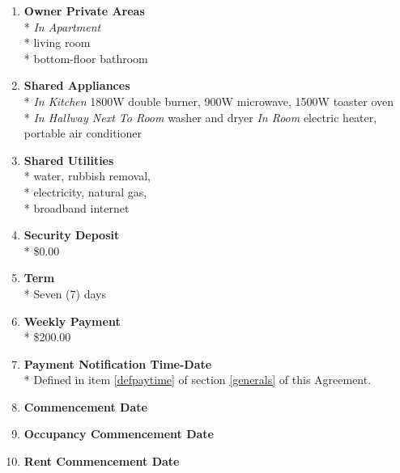 \documentclass[12pt,letterpaper]{article}
\newcommand{\apt}{Apartment}
\newcommand{\room}{Room}
\newcommand{\livingroom}{Owner Private Areas}
\newcommand{\appliances}{Shared Appliances}
\newcommand{\utilities}{Shared Utilities}
\newcommand{\deposit}{Security Deposit}
\newcommand{\rent}{Weekly Payment}
\newcommand{\signdate}{Commencement Date}
\newcommand{\firstday}{Occupancy Commencement Date}
\newcommand{\rentdate}{Rent Commencement Date}
\newcommand{\paymenttime}{Payment Notification Time-Date}
\begin{document}
\begin{multicols}{2}
\begin{enumerate}
		\item \textbf{\livingroom{}}\\* \label{livingroom}
			\textit{In \apt{}}\\*
			living room\\*
			bottom-floor bathroom
			
		\item \textbf{\appliances}\\* \label{appliances}
			\textit{In Kitchen} 1800W double burner,
			900W microwave,
			1500W toaster oven\\*
			\textit{In Hallway Next To \room{}} washer and dryer
			\textit{In \room{}} electric heater,
			portable air conditioner
			
		\item \textbf{\utilities{}}\\* \label{utilities}
			water,
			rubbish removal,\\*
			electricity,
			natural gas,\\*
			broadband internet

		\item \textbf{\deposit{}}\\* \label{deposit}
			\$0.00

		\item \textbf{Term}\\*
			Seven (7) days

		\item \textbf{\rent{}}\\* \label{rent}
			\$200.00

		\item \textbf{\paymenttime{}}\\* \label{paymenttime}
			Defined in item \ref{defpaytime} of section \ref{generals} of this Agreement.

		\item \textbf{\signdate{}} \label{signdate}

			\vspace{0.5cm}\makebox[2in]{\hrulefill}

		\item \textbf{\firstday{}} \label{firstday}

			\vspace{0.5cm}\makebox[2in]{\hrulefill}

		\item \textbf{\rentdate{}} \label{rentdate}
			
			\vspace{0.5cm}\makebox[2in]{\hrulefill}


\end{enumerate}
\end{multicols}
\end{document}
